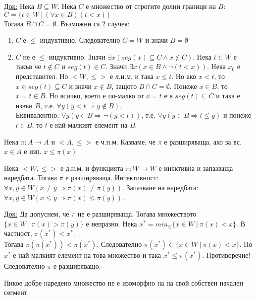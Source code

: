 \documentclass[fleqn, titlepage, 12pt]{report}
\begin{document}
\underline{Док:}  Нека $ B \subseteq W $. Нека $ C $ е множество от строгите долни граници на $ B $:\\
$ C = \{t \in W\ |\ (\forall{x \in B}) (t < x)\} $\\
Тогава $ B \cap C = \emptyset $. Възможни са 2 случея:
\begin{enumerate}
  \item $ C $ е $ \leq $-индуктивно. Следователно $ C = W $ и значи $ B = \emptyset $
  \item $ C $ не е $ \leq $-индуктивно. Значи $ \exists{x}(seg(x) \subseteq C \land x \notin C) $.
    Нека $ t \in W $ е такъв че $ t \notin C $ и $ seg(t) \in C $. Значи $ \exists{x}(x \in B \land \lnot (t < x)) $.
    Нека $ x_0 $ е представител. Но $ <W,\leq> $ е л.н.м. и така $ x \leq t $.
    Но ако $ x < t $, то $ x \in seg(t) \subseteq C $ и значи $ x \notin B $, защото $ B \cap C = \emptyset $.
    Понеже $ x \in B $, то $ x = t \in B$. Но всичко, което е по-малко от $ x = t $ е в $ seg(t) \subseteq C $
    и така е извън $ B $, т.е. $ \forall{y}(y < t \Rightarrow y \notin B) $. \\
    Еквивалентно: $ \forall{y}(y \in B \Rightarrow \lnot(y < t)) $, т.е. $ \forall{y}(y \in B \Rightarrow t \leq y) $
    и понеже $ t \in B $, то $ t $ е най-малкият елемент на $ B $.
\end{enumerate}
\bigbreak

 Нека $ \pi : A \rightarrow A $ и $ <A, \leq> $ е ч.н.м. Казваме, че $ \pi $ е разширяваща, ако за вс.
$ x \in A $ е изп. $ x \leq \pi(x) $
\bigbreak

 Нека $ <W, \leq> $ е д.н.м. и функцията $ \pi : W \rightarrow W $ е инективна и запазваща наредбата. Тогава
$ \pi $ е разширяваща. Интективност: $ \forall{x,y \in W}(x \neq y \Rightarrow \pi(x) \neq \pi(y))$.
Запазване на наредбата: $ \forall{x,y \in W }(x \leq y \Rightarrow \pi(x) \leq \pi(y)) $.
\bigbreak

\underline{Док:} Да допуснем, че $\pi$ не е разширяваща. Тогава множеството $\{x \in W\ |\ \pi(x) > \pi(y)\}$
е непразно. Нека $ x^* = min_{\leq} \{x \in W\ |\ \pi(x) < x\}$. В частност, $ \pi(x^*) < x^* $.\\
Тогава $ \pi(\pi(x^*)) < \pi(x^*) $. Следователно $ \pi(x^*) \in \{x \in W\ |\ \pi(x) < x\} $.
Но $ x^* $ е най-малкият елемент на това множество и така $ x^* \leq \pi(x^*) $. Противоречие! Следователно $ \pi $
е разширяващо.
\bigbreak

 Никое добре наредено множество не е изоморфно на на свой собствен начален сегмент.
\bigbreak
\end{document}
